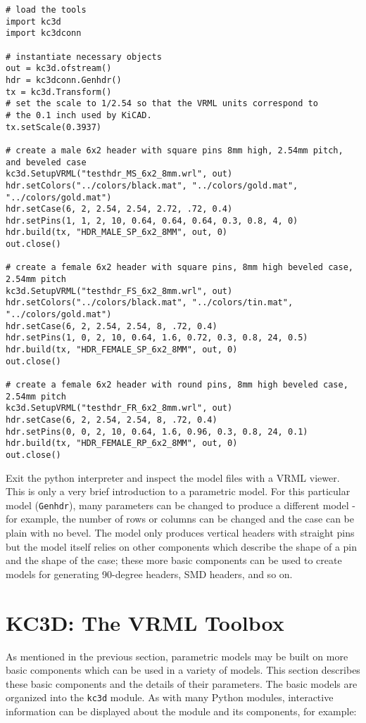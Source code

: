 \documentclass[a4paper, dvipdfm]{article}
\begin{document}
\begin{verbatim}
# load the tools
import kc3d
import kc3dconn

# instantiate necessary objects
out = kc3d.ofstream()
hdr = kc3dconn.Genhdr()
tx = kc3d.Transform()
# set the scale to 1/2.54 so that the VRML units correspond to
# the 0.1 inch used by KiCAD.
tx.setScale(0.3937)

# create a male 6x2 header with square pins 8mm high, 2.54mm pitch, and beveled case
kc3d.SetupVRML("testhdr_MS_6x2_8mm.wrl", out)
hdr.setColors("../colors/black.mat", "../colors/gold.mat", "../colors/gold.mat")
hdr.setCase(6, 2, 2.54, 2.54, 2.72, .72, 0.4)
hdr.setPins(1, 1, 2, 10, 0.64, 0.64, 0.64, 0.3, 0.8, 4, 0)
hdr.build(tx, "HDR_MALE_SP_6x2_8MM", out, 0)
out.close()

# create a female 6x2 header with square pins, 8mm high beveled case, 2.54mm pitch
kc3d.SetupVRML("testhdr_FS_6x2_8mm.wrl", out)
hdr.setColors("../colors/black.mat", "../colors/tin.mat", "../colors/gold.mat")
hdr.setCase(6, 2, 2.54, 2.54, 8, .72, 0.4)
hdr.setPins(1, 0, 2, 10, 0.64, 1.6, 0.72, 0.3, 0.8, 24, 0.5)
hdr.build(tx, "HDR_FEMALE_SP_6x2_8MM", out, 0)
out.close()

# create a female 6x2 header with round pins, 8mm high beveled case, 2.54mm pitch
kc3d.SetupVRML("testhdr_FR_6x2_8mm.wrl", out)
hdr.setCase(6, 2, 2.54, 2.54, 8, .72, 0.4)
hdr.setPins(0, 0, 2, 10, 0.64, 1.6, 0.96, 0.3, 0.8, 24, 0.1)
hdr.build(tx, "HDR_FEMALE_RP_6x2_8MM", out, 0)
out.close()
\end{verbatim}

Exit the python interpreter and inspect the model files with a VRML viewer.
This is only a very brief introduction to a parametric model. For this
particular model (\verb#Genhdr#), many parameters can be changed to produce
a different model - for example, the number of rows or columns can be changed
and the case can be plain with no bevel. The model only produces vertical
headers with straight pins but the model itself relies on other components
which describe the shape of a pin and the shape of the case; these more
basic components can be used to create models for generating 90-degree
headers, SMD headers, and so on.


\section{KC3D: The VRML Toolbox}
As mentioned in the previous section, parametric models may be built on more
basic components which can be used in a variety of models. This section
describes these basic components and the details of their parameters. The
basic models are organized into the \verb#kc3d# module. As with many Python
modules, interactive information can be displayed about the module and
its components, for example:
\end{document}
